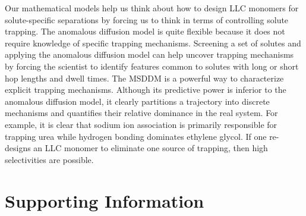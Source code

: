 \documentclass{article}
\begin{document}
  Our mathematical models help us think about how to design LLC monomers for 
  solute-specific separations by forcing us to think in terms of controlling 
  solute trapping. The anomalous diffusion model is quite flexible because it
  does not require knowledge of specific trapping mechanisms. Screening a set
  of solutes and applying the anomalous diffusion model can help uncover
  trapping mechanisms by forcing the scientist to identify features common 
  to solutes with long or short hop lengths and dwell times. The MSDDM is a 
  powerful way to characterize explicit trapping mechanisms. Although its
  predictive power is inferior to the anomalous diffusion model, it clearly
  partitions a trajectory into discrete mechanisms and quantifies their
  relative dominance in the real system. For example, it is clear that 
  sodium ion association is primarily responsible for trapping urea while 
  hydrogen bonding dominates ethylene glycol. If one re-designs an LLC monomer
  to eliminate one source of trapping, 
  then high selectivities are possible.
  
%  
%  
%
%  
  
  
  \section*{Supporting Information}
\end{document}
